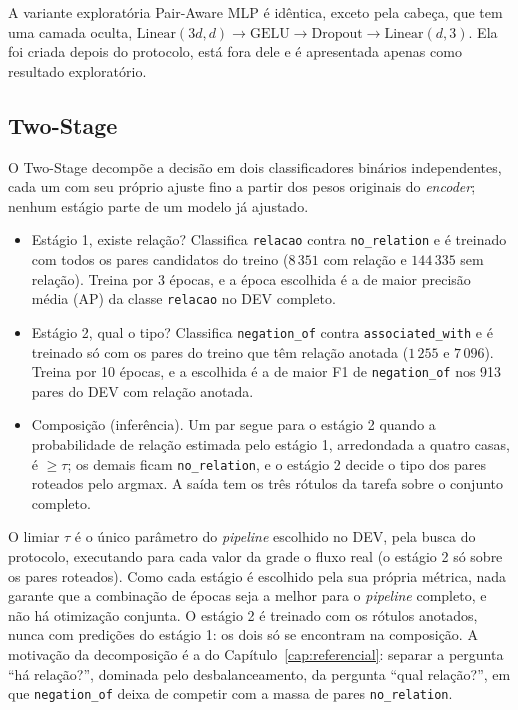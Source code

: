 A variante exploratória Pair-Aware MLP é idêntica, exceto pela cabeça, que tem uma camada oculta, $\mathrm{Linear}(3d, d) \rightarrow
\mathrm{GELU} \rightarrow \mathrm{Dropout} \rightarrow \mathrm{Linear}(d, 3)$. Ela
foi criada depois do protocolo, está fora dele e é apresentada apenas como
resultado exploratório.

\subsection{Two-Stage}
\label{sec:twostage}

O Two-Stage decompõe a decisão em dois classificadores binários independentes, cada
um com seu próprio ajuste fino a partir dos pesos originais do
\emph{encoder}; nenhum estágio parte de um modelo já ajustado.

\begin{itemize}
  \item Estágio 1, existe relação? Classifica \texttt{relacao} contra
        \texttt{no\_relation} e é treinado com todos os pares candidatos do treino
        ($8\,351$ com relação e $144\,335$ sem relação). Treina por 3 épocas, e a
        época escolhida é a de maior precisão média (AP) da classe \texttt{relacao}
        no DEV completo.
  \item Estágio 2, qual o tipo? Classifica \texttt{negation\_of} contra
        \texttt{associated\_with} e é treinado só com os pares do treino que têm
        relação anotada ($1\,255$ e $7\,096$). Treina por 10 épocas, e a escolhida é
        a de maior F1 de \texttt{negation\_of} nos 913 pares do DEV com relação
        anotada.
  \item Composição (inferência). Um par segue para o estágio 2 quando a
        probabilidade de relação estimada pelo estágio 1, arredondada a quatro
        casas, é $\geq \tau$; os demais ficam \texttt{no\_relation}, e o estágio 2
        decide o tipo dos pares roteados pelo argmax. A saída tem os três rótulos da
        tarefa sobre o conjunto completo.
\end{itemize}

O limiar $\tau$ é o único parâmetro do \emph{pipeline} escolhido no DEV, pela busca
do protocolo, executando para cada valor da grade o fluxo real (o estágio 2 só sobre
os pares roteados). Como cada estágio é escolhido pela sua própria métrica, nada
garante que a combinação de épocas seja a melhor para o \emph{pipeline} completo, e
não há otimização conjunta. O estágio 2 é treinado com os rótulos anotados, nunca
com predições do estágio 1: os dois só se encontram na composição. A motivação da
decomposição é a do Capítulo~\ref{cap:referencial}: separar a pergunta ``há
relação?'', dominada pelo desbalanceamento, da pergunta ``qual relação?'', em que
\texttt{negation\_of} deixa de competir com a massa de pares \texttt{no\_relation}.
